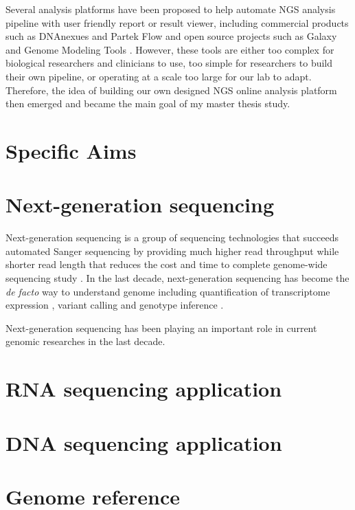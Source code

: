 Several analysis platforms have been proposed to help automate NGS analysis
pipeline with user friendly report or result viewer, including commercial
products such as DNAnexues \cite{:dnanexus} and Partek Flow \cite{:partek} and
open source projects such as Galaxy \cite{goecks2010:galaxy} and Genome
Modeling Tools \cite{griffith2015:genome}. However, these tools are either too
complex for biological researchers and clinicians to use, too simple for
researchers to build their own pipeline, or operating at a scale too large for
our lab to adapt. Therefore, the idea of building our own designed NGS online
analysis platform then emerged and became the main goal of my master thesis
study.


\section{Specific Aims}
\label{s:specific-aim}

%
%

\section{Next-generation sequencing}
\label{s:ngs}

Next-generation sequencing is a group of sequencing technologies that succeeds
automated Sanger sequencing by providing much higher read throughput while
shorter read length that reduces the cost and time to complete genome-wide
sequencing study \cite{metzker2010:sequencing}. In the last decade,
next-generation sequencing has become the \textit{de facto} way to understand
genome \cite{vandijk2014:ten} including quantification of transcriptome
expression \cite{wang2009:rnaseq}, variant calling and genotype inference
\cite{nielsen2011:genotype}.


Next-generation sequencing has been playing an important role in current genomic
researches in the last decade.


\section{RNA sequencing application}
\label{s:rna-seq-app}

\section{DNA sequencing application}
\label{s:dna-seq-app}

\section{Genome reference}
\label{s:genome-ref}






